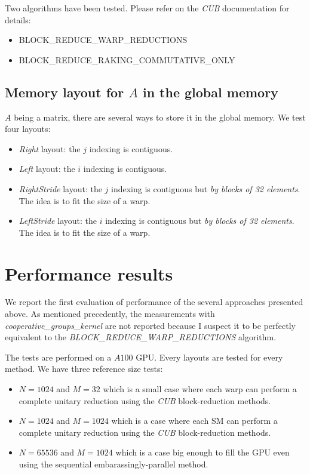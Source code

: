 \documentclass{article}
\begin{document}
Two algorithms have been tested. Please refer on the \textit{CUB} documentation for details:

\begin{itemize}
\item BLOCK\_REDUCE\_WARP\_REDUCTIONS
\item BLOCK\_REDUCE\_RAKING\_COMMUTATIVE\_ONLY 
\end{itemize}

\subsection{Memory layout for $A$ in the global memory}

$A$ being a matrix, there are several ways to store it in the global memory. We test four layouts:

\begin{itemize}
	\item \textit{Right} layout: the $j$ indexing is contiguous.
	\item \textit{Left} layout: the $i$ indexing is contiguous.
	\item \textit{RightStride} layout: the $j$ indexing is contiguous but \textit{by blocks of 32 elements}. The idea is to fit the size of a warp.
	\item \textit{LeftStride} layout: the $i$ indexing is contiguous but \textit{by blocks of 32 elements}. The idea is to fit the size of a warp.
\end{itemize}

\section{Performance results}

We report the first evaluation of performance of the several approaches presented above. As mentioned precedently, the measurements with \textit{cooperative\_groups\_kernel} are not reported because I suspect it to be perfectly equivalent to the \textit{BLOCK\_REDUCE\_WARP\_REDUCTIONS} algorithm.

The tests are performed on a $A100$ GPU. Every layouts are tested for every method. We have three reference size tests:

\begin{itemize}
	\item $N = 1024$ and $M=32$ which is a small case where each warp can perform a complete unitary reduction using the \textit{CUB} block-reduction methods.
	\item $N = 1024$ and $M=1024$ which is a case where each SM can perform a complete unitary reduction using the \textit{CUB} block-reduction methods.
	\item $N = 65536$ and $M=1024$ which is a case big enough to fill the GPU even using the sequential embarassingly-parallel method.
\end{itemize}
\end{document}

